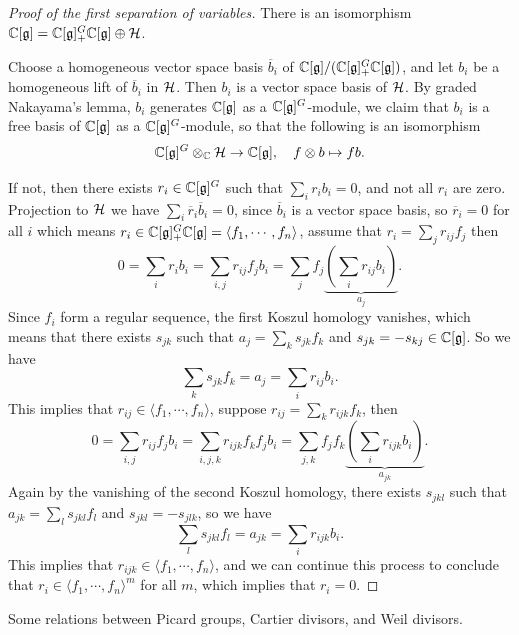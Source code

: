 \begin{proof}[Proof of the first separation of variables]
  There is an isomorphism $\mathbb{C}[\mathfrak{g}] = \mathbb{C}[\mathfrak{g}]^G_{+}\mathbb{C}[\mathfrak{g}] \oplus \mathcal{H}$.

  Choose a homogeneous vector space basis $\overline{b}_i$ of $\mathbb{C}[\mathfrak{g}]/(\mathbb{C}[\mathfrak{g}]^G_{+}\mathbb{C}[\mathfrak{g}])$, and let $b_i$ be a homogeneous lift of $\overline{b}_i$ in $\mathcal{H}$. Then $b_i$ is a vector space basis of $\mathcal{H}$. By graded Nakayama's lemma, $b_i$ generates $\mathbb{C}[\mathfrak{g}]$ as a $\mathbb{C}[\mathfrak{g}]^G$-module, we claim that $b_i$ is a free basis of $\mathbb{C}[\mathfrak{g}]$ as a $\mathbb{C}[\mathfrak{g}]^G$-module, so that the following is an isomorphism
  \[
    \mathbb{C}[\mathfrak{g}]^G \otimes_{\mathbb{C}} \mathcal{H} \to \mathbb{C}[\mathfrak{g}], \quad f \otimes b \mapsto f b.
  \]

  If not, then there exists $r_i \in \mathbb{C}[\mathfrak{g}]^G$ such that $\sum_{i} r_i b_i = 0$, and not all $r_i$ are zero. Projection to $\mathcal{H}$ we have $\sum_{i} \overline{r}_i \overline{b}_i = 0$, since $\overline{b}_i$ is a vector space basis, so $\overline{r}_i = 0$ for all $i$ which means $r_i \in \mathbb{C}[\mathfrak{g}]^G_{+}\mathbb{C}[\mathfrak{g}] = \langle f_1, \cdots, f_n \rangle$, assume that $r_i = \sum_{j} r_{ij} f_j$ then
  \[
    0 = \sum_{i} r_i b_i = \sum_{i,j} r_{ij} f_j b_i = \sum_{j} f_j \underbrace{\left( \sum_{i} r_{ij} b_i \right)}_{a_j}.
  \]
  Since $f_i$ form a regular sequence, the first Koszul homology vanishes, which means that there exists $s_{jk}$ such that $a_j = \sum_{k} s_{jk} f_k $ and $s_{jk} = -s_{kj} \in \mathbb{C}[\mathfrak{g}]$. So we have
  \[
    \sum_{k} s_{jk} f_k = a_j = \sum_{i} r_{ij} b_i.
  \]
  This implies that $r_{ij} \in \langle f_1, \cdots, f_n \rangle$, suppose $r_{ij} = \sum_{k} r_{ijk} f_k$, then
  \[
    0 = \sum_{i,j} r_{ij} f_j b_i = \sum_{i,j,k} r_{ijk} f_k f_j b_i = \sum_{j,k} f_j f_k \underbrace{\left( \sum_{i} r_{ijk} b_i \right)}_{a_{jk}}.
  \]
  Again by the vanishing of the second Koszul homology, there exists $s_{jkl}$ such that $a_{jk} = \sum_{l} s_{jkl} f_l$ and $s_{jkl} = -s_{jlk}$, so we have
  \[
    \sum_{l} s_{jkl} f_l = a_{jk} = \sum_{i} r_{ijk} b_i.
  \]
  This implies that $r_{ijk} \in \langle f_1, \cdots, f_n \rangle$, and we can continue this process to conclude that $r_i \in \langle f_1, \cdots, f_n \rangle^m$ for all $m$, which implies that $r_i = 0$.
\end{proof}










Some relations between Picard groups, Cartier divisors, and Weil divisors.

